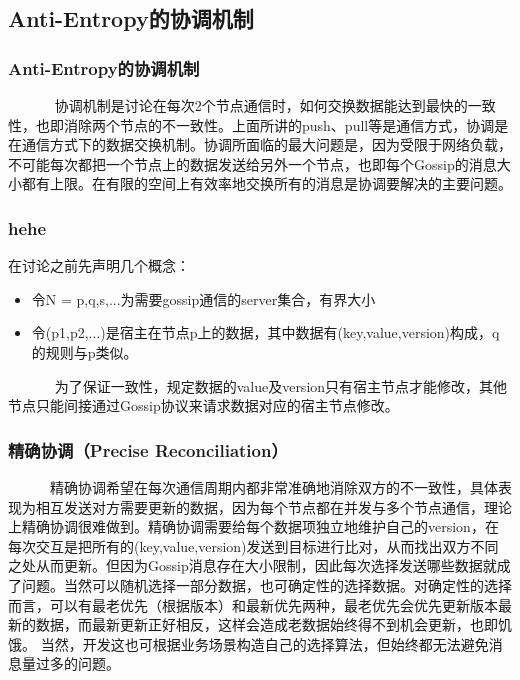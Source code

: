 \documentclass[slidestop,compress,mathserif,c]{beamer}
\begin{document}
\subsection{\hfill Anti-Entropy的协调机制}
\begin{frame}
\frametitle{Anti-Entropy的协调机制}
~~~~~~ 协调机制是讨论在每次2个节点通信时，如何交换数据能达到最快的一致性，也即消除两个节点的不一致性。上面所讲的push、pull等是通信方式，协调是在通信方式下的数据交换机制。协调所面临的最大问题是，因为受限于网络负载，不可能每次都把一个节点上的数据发送给另外一个节点，也即每个Gossip的消息大小都有上限。在有限的空间上有效率地交换所有的消息是协调要解决的主要问题。
\end{frame}

\begin{frame}
\frametitle{hehe}
 在讨论之前先声明几个概念：
 \begin{itemize}
 \item 令N = {p,q,s,...}为需要gossip通信的server集合，有界大小
 \item 令(p1,p2,...)是宿主在节点p上的数据，其中数据有(key,value,version)构成，q的规则与p类似。
 \end{itemize}
~~~~~~ 为了保证一致性，规定数据的value及version只有宿主节点才能修改，其他节点只能间接通过Gossip协议来请求数据对应的宿主节点修改。
\end{frame}

\begin{frame}
\frametitle{精确协调（Precise Reconciliation）}
 ~~~~~~精确协调希望在每次通信周期内都非常准确地消除双方的不一致性，具体表现为相互发送对方需要更新的数据，因为每个节点都在并发与多个节点通信，理论上精确协调很难做到。精确协调需要给每个数据项独立地维护自己的version，在每次交互是把所有的(key,value,version)发送到目标进行比对，从而找出双方不同之处从而更新。但因为Gossip消息存在大小限制，因此每次选择发送哪些数据就成了问题。当然可以随机选择一部分数据，也可确定性的选择数据。对确定性的选择而言，可以有最老优先（根据版本）和最新优先两种，最老优先会优先更新版本最新的数据，而最新更新正好相反，这样会造成老数据始终得不到机会更新，也即饥饿。
当然，开发这也可根据业务场景构造自己的选择算法，但始终都无法避免消息量过多的问题。
\end{frame}
\end{document}
